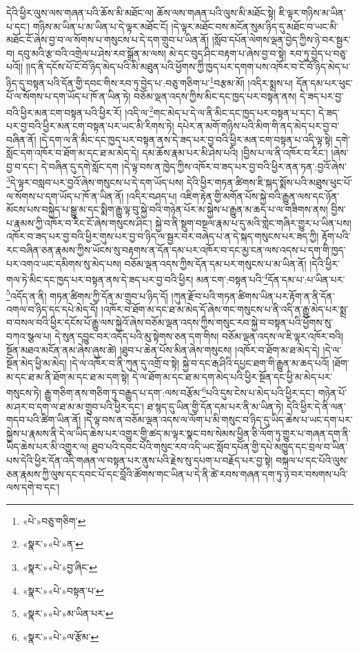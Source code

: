དེའི་ཕྱིར་ལུས་ལས་གཞན་པའི་ཆོས་མི་མཐོང་ལ། ཆོས་ལས་གཞན་པའི་ལུས་མི་མཐོང་སྟེ། ཇི་ལྟར་གཉིས་མ་ཡིན་པ་དང་། གཉིས་མ་ཡིན་པ་མ་ཡིན་པ་དེ་ལྟར་མཐོང་ངོ། །དེ་ལྟར་མཐོང་བས་མངོན་སུམ་ཉིད་དུ་མཐོང་བ་ཡང་མི་མཐོང་ངོ་ཞེས་བྱ་བ་ལ་སོགས་པ་གསུངས་པ་དེ་དག་གྲུབ་པ་ཡིན་ནོ། །སློབ་དཔོན་ལེགས་ལྡན་བྱེད་ཀྱིས་ཉེ་བར་སྦྱར་བ། དབུ་མའི་རྩ་བའི་འགྲེལ་པ་ཤེས་རབ་སྒྲོན་མ་ལས། མེ་དང་བུད་ཤིང་བརྟག་པ་ཞེས་བྱ་བ་སྟེ། རབ་ཏུ་བྱེད་པ་བཅུ་པའོ།། །།ད་ནི་དངོས་པོ་ངོ་བོ་ཉིད་མེད་པའི་མི་མཐུན་པའི་ཕྱོགས་ཀྱི་ཁྱད་པར་དགག་པས་འཁོར་བ་ངོ་བོ་ཉིད་མེད་པ་ཉིད་དུ་བསྟན་པའི་དོན་གྱི་དབང་གིས་རབ་ཏུ་བྱེད་པ་:བཅུ་གཅིག་པ་\footnote{«པེ་»བཅུ་གཅིག་}བརྩམ་མོ། །འདིར་སྨྲས་པ། དོན་དམ་པར་ཕུང་པོ་ལ་སོགས་པ་དག་ཡོད་པ་ཁོ་ན་ཡིན་ཏེ། བཅོམ་ལྡན་འདས་ཀྱིས་མིང་དང་ཁྱད་པར་བསྟན་ནས། དེ་ཟད་པར་བྱ་བའི་ཕྱིར་མན་ངག་བསྟན་པའི་ཕྱིར་རོ། །འདི་ལ་\footnote{«སྣར་»«པེ་»ན་}གང་མེད་པ་དེ་ལ་ནི་མིང་དང་ཁྱད་པར་བསྟན་པ་དང་། དེ་ཟད་པར་བྱ་བའི་ཕྱིར་མན་ངག་བསྟན་པར་ཡང་མི་རིགས་ཏེ། དཔེར་ན་མགོ་གཉིས་པའི་མིག་གི་ནད་མེད་པར་བྱ་བ་བཞིན་ནོ། །དེ་དག་ལ་ནི་མིང་དང་ཁྱད་པར་བསྟན་ནས་དེ་ཟད་པར་བྱ་བའི་ཕྱིར་མན་ངག་བསྟན་པ་འདི་ལྟ་སྟེ། དགེ་སློང་དག་འཁོར་བ་ཐོག་མ་དང་ཐ་མ་མེད་དེ། དམ་ཆོས་རྣམ་པར་མི་ཤེས་པའི། །བྱིས་པ་ལ་ནི་འཁོར་བ་རིང་། །ཞེས་བྱ་བ་དང་། དེ་བཞིན་དུ་དགེ་སློང་དག །དེ་ལྟ་བས་ན་ཁྱེད་ཀྱིས་འཁོར་བ་ཟད་པར་བྱ་བའི་ཕྱིར་ནན་ཏན་:བྱའོ་ཞེས་\footnote{«སྣར་»«པེ་»བྱ་ཞིང་}དེ་ལྟར་བསླབ་པར་བྱའོ་ཞེས་གསུངས་པ་དེ་དག་ཡོད་པས། དེའི་ཕྱིར་གཏན་ཚིགས་ཇི་སྐད་སྨོས་པའི་མཐུས་ཕུང་པོ་ལ་སོགས་པ་དག་ཡོད་པ་ཁོ་ན་ཡིན་ནོ། །འདིར་བཤད་པ། འཇིག་རྟེན་གྱི་མགོན་པོས་སྐྱེ་བའི་རྒྱུན་ལས་དང་ཉོན་མོངས་པས་བསྐྱེད་པ་སྒྱུ་མ་དང་སྨིག་རྒྱུ་ལྟ་བུ་སྐྱེ་བའི་གཉེན་པོར་མ་སྐྱེས་པ་རྒྱུན་མ་ཆད་པ་ལ་གཟིགས་ནས། བྱིས་པ་རྣམས་ཀྱི་འཁོར་བ་རིང་ངོ་ཞེས་གསུངས་ཤིང་། སྐྱེ་བ་ནི་སྡུག་བསྔལ་རྣམ་པ་དུ་མའི་གླེང་གཞིར་གྱུར་པ་ཡིན་པས། འཁོར་བ་ཟད་པར་བྱ་བའི་ཕྱིར་གུས་པར་བྱ་བ་ཉིད་ལ་སྦྱར་བར་བཞེད་པ་ན་དེ་སྐད་གསུངས་པར་ཟད་ཀྱི། རྟོག་པའི་རང་བཞིན་ཅན་རྣམས་ཀྱིས་ཡོངས་སུ་བརྟགས་ན་དོན་དམ་པར་འཁོར་བ་དང་མྱ་ངན་ལས་འདས་པ་དག་གི་ཁྱད་པར་འགའ་ཡང་དམིགས་སུ་མེད་པས། བཅོམ་ལྡན་འདས་ཀྱིས་དོན་དམ་པར་གསུངས་པ་མ་ཡིན་ནོ། །དེའི་ཕྱིར་གལ་ཏེ་མིང་དང་ཁྱད་པར་བསྟན་ནས་དེ་ཟད་པར་བྱ་བའི་ཕྱིར། མན་ངག་:བསྟན་པའི་\footnote{«སྣར་»«པེ་»བསྟན་པ་}དོན་དམ་པ་:པ་ཡིན་པར་\footnote{«སྣར་»«པེ་»མ་ཡིན་པར་}འདོད་ན་ནི། གཏན་ཚིགས་ཀྱི་དོན་མ་གྲུབ་པ་ཉིད་དོ། །ཀུན་རྫོབ་པའི་གཏན་ཚིགས་ཡིན་པར་རྟོག་ན་ནི་དོན་འགལ་བ་ཉིད་དང་དཔེ་མེད་དོ། །འཁོར་བ་ཐོག་མ་དང་ཐ་མ་མེད་དོ་ཞེས་གང་གསུངས་པ་ནི་འདི་ན་རྒྱུ་མེད་པར་སྨྲ་བ་བསལ་བའི་ཕྱིར་དངོས་པོ་རྒྱུ་ལས་སྐྱེའོ་ཞེས་བཅོམ་ལྡན་འདས་ཀྱིས་གསུང་རབ་སྐྱེ་བ་བསྟན་པའི་ཕྱོགས་སུ་བཀའ་སྩལ་པ། དེ་སུན་དབྱུང་བར་འདོད་པའི་མུ་སྟེགས་ཅན་དག་གིས། བཅོམ་ལྡན་འདས་ལ་ཇི་ལྟར་འཁོར་བའི། སྔོན་མཐའ་མངོན་ནམ་ཞེས་ཞུས་ཚེ། །ཐུབ་པ་ཆེན་པོས་མིན་ཞེས་གསུངས། །འཁོར་བ་ཐོག་མ་ཐ་མེད་དེ། །དེ་ལ་སྔོན་མེད་ཕྱི་མ་མེད། །དེ་ལ་འཁོར་བ་ནི་ཀུན་དུ་འགྲོ་བ་སྟེ། སྐྱེ་བ་དང་རྒ་ཤིའི་དཔྱང་ཐག་གི་རྒྱུན་མ་ཆད་པའོ། །ཐོག་མ་དང་ཐ་མ་ནི་ཐོག་མ་དང་ཐ་མ་དག་སྟེ། དེ་ལ་ཐོག་མ་དང་ཐ་མ་དག་མེད་པའི་ཕྱིར་སྔོན་དང་ཕྱི་མ་མེད་པར་གསུངས་ཏེ། རྒྱུ་གཅིག་ནས་གཅིག་ཏུ་བརྒྱུད་པ་དག་:ལས་བརྩོམ་\footnote{«སྣར་»«པེ་»ལ་རྩོམ་}པའི་དུས་ངེས་པ་མེད་པའི་ཕྱིར་དང་། གཉེན་པོ་མ་ཤར་བ་དག་ལ་ཐ་མ་མ་གྲུབ་པའི་ཕྱིར་དང་། ཐ་སྙད་དུ་ཡིན་གྱི་དོན་དམ་པར་ནི་མ་ཡིན་ཏེ། དེའི་ཕྱིར་དེ་ནི་ལན་གདབ་པའི་ཚིག་ཡིན་ནོ། །དེ་ལྟ་བས་ན་བཅོམ་ལྡན་འདས་ལ་ལོག་པ་མི་གསུང་བ་ཉིད་དུ་ཡིད་ཆེས་པ་ཡང་དག་པར་སྐྱེས་པ་རྣམས་ནི་དེ་ལ་ཡིད་ཆེས་པར་འགྱུར་གྱི་ཚད་མ་ལྟར་སྣང་བས་སེམས་ཕྱིན་ཅི་ལོག་ཏུ་གྱུར་པ་གཞན་དག་ནི་ཡིད་ཆེས་པར་མི་འགྱུར་ལ། ཐུབ་པའི་དབང་པོའི་གསུང་རབ་འདི་ཡང་སློབ་དཔོན་གྱི་དཔེ་མཁྱུད་དང་བྲལ་བ་ཡིན་པས་དེའི་ཕྱིར་དོན་འདི་གཞན་ལ་བསྟན་པར་ནུས་པའི་རྗེས་སུ་དཔག་པ་བརྗོད་པར་བྱ་སྟེ། བསྐལ་པ་དང་པོའི་ལུས་ཅན་རྣམས་ཀྱི་ལུས་དང་དབང་པོ་དང་བློའི་ཚོགས་གང་ཡིན་པ་དེ་ནི་ཚེ་རབས་གཞན་དག་ཏུ་ཉེ་བར་བསགས་པའི་ལས་དགེ་བ་དང་། 
